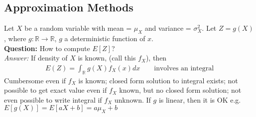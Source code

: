 \subsection*{Approximation Methods}
Let $X$ be a random variable with mean = $\mu_X$ and variance = $\sigma_X^2$. Let $Z = g(X)$, where $g: \mathbb{R} \rightarrow \mathbb{R}$, $g$ a deterministic function of $x$.\\
\textbf{Question:} How to compute $E[Z]$?\\
\emph{Answer: } If density of $X$ is known, (call this $f_X$), then 
\begin{gather*}
	E(Z) = \int_\mathbb{R} g(X) f_X(x)dx \hspace{2em} \text{involves an integral}
\end{gather*}
Cumbersome even if $f_X$ is known; closed form solution to integral exists; not possible to get exact value even if $f_X$ known, but no closed form solution; not even possible to write integral if $f_X$ unknown. If $g$ is linear, then it is OK e.g. $E[g(X)] = E[aX + b] = a\mu_X + b$
